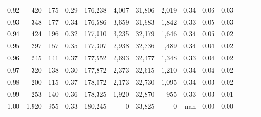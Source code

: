 \begin{tabular}{rrrrrrrrrrrrrr}
0.92 &    420 &  175 &  0.29 &  176,238 &    4,007 &  31,806 &   2,019 &  0.34 &  0.06 &      0.03 \\
0.93 &    348 &  177 &  0.34 &  176,586 &    3,659 &  31,983 &   1,842 &  0.33 &  0.05 &      0.03 \\
0.94 &    424 &  196 &  0.32 &  177,010 &    3,235 &  32,179 &   1,646 &  0.34 &  0.05 &      0.02 \\
0.95 &    297 &  157 &  0.35 &  177,307 &    2,938 &  32,336 &   1,489 &  0.34 &  0.04 &      0.02 \\
0.96 &    245 &  141 &  0.37 &  177,552 &    2,693 &  32,477 &   1,348 &  0.33 &  0.04 &      0.02 \\
0.97 &    320 &  138 &  0.30 &  177,872 &    2,373 &  32,615 &   1,210 &  0.34 &  0.04 &      0.02 \\
0.98 &    200 &  115 &  0.37 &  178,072 &    2,173 &  32,730 &   1,095 &  0.34 &  0.03 &      0.02 \\
0.99 &    253 &  140 &  0.36 &  178,325 &    1,920 &  32,870 &     955 &  0.33 &  0.03 &      0.01 \\
1.00 &  1,920 &  955 &  0.33 &  180,245 &        0 &  33,825 &       0 &   nan &  0.00 &      0.00 \\
\bottomrule
\end{tabular}
